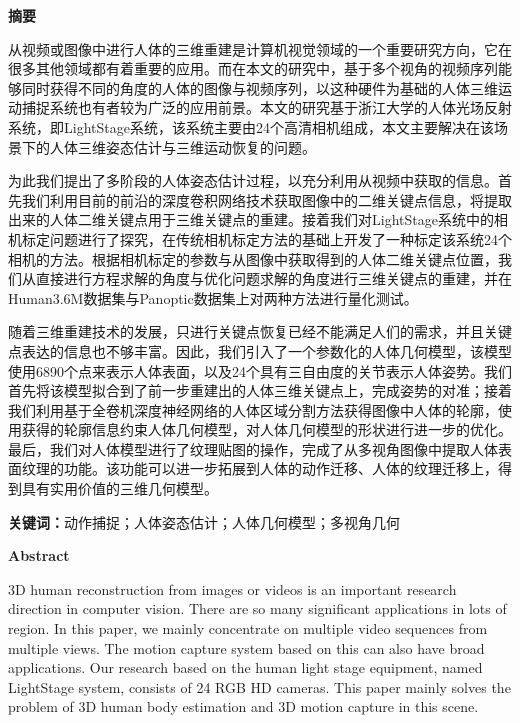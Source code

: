 \begin{center}
    {\bfseries {} 摘要}
\end{center}

从视频或图像中进行人体的三维重建是计算机视觉领域的一个重要研究方向，它在很多其他领域都有着重要的应用。而在本文的研究中，基于多个视角的视频序列能够同时获得不同的角度的人体的图像与视频序列，以这种硬件为基础的人体三维运动捕捉系统也有者较为广泛的应用前景。本文的研究基于浙江大学的人体光场反射系统，即LightStage系统，该系统主要由24个高清相机组成，本文主要解决在该场景下的人体三维姿态估计与三维运动恢复的问题。

为此我们提出了多阶段的人体姿态估计过程，以充分利用从视频中获取的信息。首先我们利用目前的前沿的深度卷积网络技术获取图像中的二维关键点信息，将提取出来的人体二维关键点用于三维关键点的重建。接着我们对LightStage系统中的相机标定问题进行了探究，在传统相机标定方法的基础上开发了一种标定该系统24个相机的方法。根据相机标定的参数与从图像中获取得到的人体二维关键点位置，我们从直接进行方程求解的角度与优化问题求解的角度进行三维关键点的重建，并在Human3.6M数据集与Panoptic数据集上对两种方法进行量化测试。

随着三维重建技术的发展，只进行关键点恢复已经不能满足人们的需求，并且关键点表达的信息也不够丰富。因此，我们引入了一个参数化的人体几何模型，该模型使用6890个点来表示人体表面，以及24个具有三自由度的关节表示人体姿势。我们首先将该模型拟合到了前一步重建出的人体三维关键点上，完成姿势的对准；接着我们利用基于全卷机深度神经网络的人体区域分割方法获得图像中人体的轮廓，使用获得的轮廓信息约束人体几何模型，对人体几何模型的形状进行进一步的优化。最后，我们对人体模型进行了纹理贴图的操作，完成了从多视角图像中提取人体表面纹理的功能。该功能可以进一步拓展到人体的动作迁移、人体的纹理迁移上，得到具有实用价值的三维几何模型。

\textbf{关键词：}动作捕捉；人体姿态估计；人体几何模型；多视角几何

\newpage
\begin{center}
    \bfseries {} Abstract
\end{center}

3D human reconstruction from images or videos is an important research direction in computer vision. There are so many significant applications in lots of region. In this paper, we mainly concentrate on multiple video sequences from multiple views. The motion capture system based on this can also have broad applications. Our research based on the human light stage equipment, named LightStage system, consists of 24 RGB HD cameras. This paper mainly solves the problem of 3D human body estimation and 3D motion capture in this scene.

